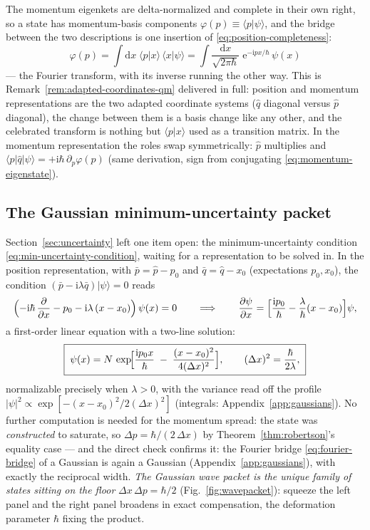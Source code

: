\documentclass[11pt]{article}
\theoremstyle{plain}
\theoremstyle{definition}
\theoremstyle{remark}
\newcommand{\dd}{\mathrm{d}}
\newcommand{\ee}{\mathrm{e}}
\newcommand{\ii}{\mathrm{i}}
\newcommand{\pd}[2]{\frac{\partial #1}{\partial #2}}
\newcommand{\op}[1]{\hat{#1}}
\newcommand{\ket}[1]{\lvert #1 \rangle}
\newcommand{\bra}[1]{\langle #1 \rvert}
\newcommand{\braket}[2]{\langle #1 | #2 \rangle}
\begin{document}
The momentum eigenkets are delta-normalized and complete in their
own right, so a state has momentum-basis components
$\varphi(p) \equiv \braket p\psi$, and the bridge between the two
descriptions is one insertion of
\eqref{eq:position-completeness}:
\begin{equation}
  \varphi(p)
  = \int\dd x\;\braket px\,\braket x\psi
  = \int\frac{\dd x}{\sqrt{2\pi\hbar}}\;
    \ee^{-\ii p x/\hbar}\,\psi(x)
  \label{eq:fourier-bridge}
\end{equation}
--- the Fourier transform, with its inverse running the other way.
This is Remark~\ref{rem:adapted-coordinates-qm} delivered in
full: position and momentum representations are the two adapted
coordinate systems ($\op q$ diagonal versus $\op p$ diagonal), the
change between them is a basis change like any other, and the
celebrated transform is nothing but
$\braket px$ used as a transition matrix. In the momentum
representation the roles swap symmetrically: $\op p$ multiplies and
$\bra p\op q\ket\psi = +\ii\hbar\,\partial_p\varphi(p)$ (same
derivation, sign from conjugating \eqref{eq:momentum-eigenstate}).

\subsection{The Gaussian minimum-uncertainty packet}
\label{sec:gaussian-packet}

Section~\ref{sec:uncertainty} left one item open: the
minimum-uncertainty
condition \eqref{eq:min-uncertainty-condition}, waiting for a
representation to be solved in. In the position representation,
with $\bar p = \op p - p_0$ and $\bar q = \op q - x_0$
(expectations $p_0, x_0$), the condition
$(\bar p - \ii\lambda\bar q)\ket\psi = 0$ reads
\begin{equation}
  \Bigl(
    -\ii\hbar\,\pd{}{x} - p_0
    - \ii\lambda\,(x - x_0)
  \Bigr)\,\psi(x) = 0
  \qquad\Longrightarrow\qquad
  \pd\psi x
  = \Bigl[
      \frac{\ii p_0}{\hbar}
      - \frac{\lambda}{\hbar}(x - x_0)
    \Bigr]\psi ,
\end{equation}
a first-order linear equation with a two-line solution:
\begin{equation}
  \boxed{\;
  \psi(x)
  = N\,
    \exp\!\Bigl[
      \frac{\ii p_0 x}{\hbar}
      \;-\;
      \frac{(x - x_0)^2}{4(\Delta x)^2}
    \Bigr],
  \qquad
  (\Delta x)^2 = \frac{\hbar}{2\lambda} ,
  \;}
  \label{eq:gaussian-packet}
\end{equation}
normalizable precisely when $\lambda > 0$, with the variance read
off the profile
$|\psi|^2 \propto \exp[-(x-x_0)^2/2(\Delta x)^2]$
(integrals: Appendix~\ref{app:gaussians}). No further computation is needed for
the momentum spread: the state was \emph{constructed} to saturate,
so $\Delta p = \hbar/(2\,\Delta x)$ by Theorem~\ref{thm:robertson}'s
equality case --- and the direct check confirms it: the Fourier
bridge \eqref{eq:fourier-bridge} of a Gaussian is again a Gaussian
(Appendix~\ref{app:gaussians}), with exactly the reciprocal width.
\emph{The Gaussian wave packet is the unique family of states
sitting on the floor} $\Delta x\,\Delta p = \hbar/2$
(Fig.~\ref{fig:wavepacket}): squeeze the left panel and the right
panel broadens in exact compensation, the deformation parameter
$\hbar$ fixing the product.
\end{document}
